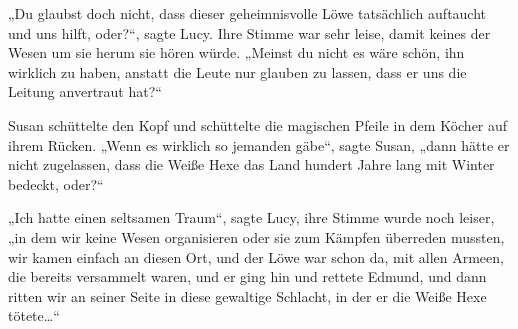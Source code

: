 „Du glaubst doch nicht, dass dieser geheimnisvolle Löwe tatsächlich auftaucht und uns hilft, oder?“, sagte Lucy. Ihre Stimme war sehr leise, damit keines der Wesen um sie herum sie hören würde. „Meinst du nicht es wäre schön, ihn wirklich zu haben, anstatt die Leute nur glauben zu lassen, dass er uns die Leitung anvertraut hat?“

Susan schüttelte den Kopf und schüttelte die magischen Pfeile in dem Köcher auf ihrem Rücken. „Wenn es wirklich so jemanden gäbe“, sagte Susan, „dann hätte er nicht zugelassen, dass die Weiße Hexe das Land hundert Jahre lang mit Winter bedeckt, oder?“

„Ich hatte einen seltsamen Traum“, sagte Lucy, ihre Stimme wurde noch leiser, „in dem wir keine Wesen organisieren oder sie zum Kämpfen überreden mussten, wir kamen einfach an diesen Ort, und der Löwe war schon da, mit allen Armeen, die bereits versammelt waren, und er ging hin und rettete Edmund, und dann ritten wir an seiner Seite in diese gewaltige Schlacht, in der er die Weiße Hexe tötete…“

